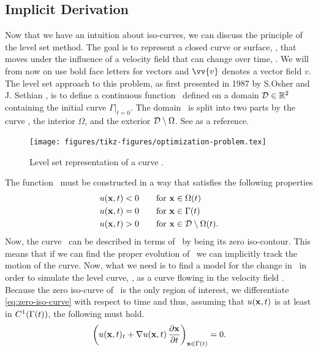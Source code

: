 \subsection{Implicit Derivation}
Now that we have an intuition about iso-curves, we can discuss the principle of the level set method. The goal is to represent a closed curve or surface, \curve, that moves under the influence of a velocity field that can change over time, \velocityfield. We will from now on use bold face letters for vectors and $\vv{v}$ denotes a vector field $v$. The level set approach to this problem, as first presented in 1987 by S.Osher and J. Sethian \cite{Osher-Sethian}, is to define a continuous function \uxt\ defined on a domain $\mathcal{D} \in \mathbb{R}^2$ containing the initial curve $\Gamma|_{t=0}$. The domain \domain\ is split into two parts by the curve \curve, the interior $\Omega$, and the exterior  $\mathcal{D} \setminus \Omega$. See  as a reference.
\begin{figure}
    \centering
    \texttt{[image: figures/tikz-figures/optimization-problem.tex]}
    \caption[Level set function]{Level set representation of a curve \curve.}
    \label{fig:levelset-representation}
\end{figure}
The function \uxt\ must be constructed in a way that satisfies the following properties
\begin{align}
    u(\mathbf{x}, t) < 0 \qquad &\text{for } \mathbf{x} \in  \Omega(t) \label{eq:interior}\\
    u(\mathbf{x}, t) = 0 \qquad &\text{for } \mathbf{x} \in  \Gamma (t) \label{eq:zero-iso-curve}\\
    u(\mathbf{x}, t) > 0 \qquad &\text{for } \mathbf{x} \in  \mathcal{D} \setminus \Omega(t) \label{eq:exterior}.
\end{align}
Now, the curve \curve\ can be described in terms of \uxt\ by being its zero iso-contour. This means that if we can find the proper evolution of 
\uxt\ we can implicitly track the motion of the curve.
Now, what we need is to find a model for the change in \uxt\ in order
to simulate the level curve, \curve, as a curve flowing in the velocity field \velocityfield. Because the zero iso-curve of \uxt\ is the only region of interest, we differentiate \eqref{eq:zero-iso-curve} with respect to time and thus, assuming that $u(\mathbf{x}, t)$ is at least in $C^1(\Gamma (t))$, the following must hold.
\begin{equation}
    \bigg(u(\mathbf{x}, t)_t + \nabla u(\mathbf{x}, t) \, \frac{\partial \mathbf{x}}{\partial t} \bigg)_{\mathbf{x}\in \Gamma (t)} = 0.
    \label{eq:general-u-flow}
\end{equation}
